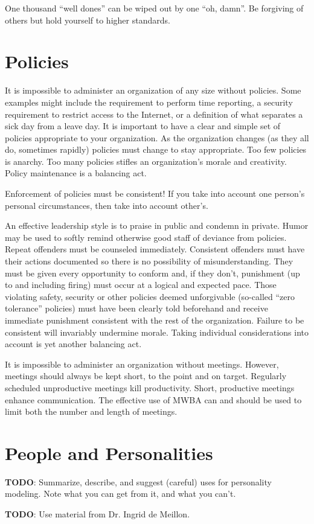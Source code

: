 One thousand ``well dones'' can be wiped out by one ``oh, damn''. Be forgiving of others but hold yourself to higher standards.


\section{Policies}

It is impossible to administer an organization of any size without policies.  Some examples might include the requirement to perform time reporting, a security requirement to restrict access to the Internet, or a definition of what separates a sick day from a leave day. It is important to have a clear and simple set of policies appropriate to your organization.  As the organization changes (as they all do, sometimes rapidly) policies must change to stay appropriate.  Too few policies is anarchy.  Too many policies stifles an organization's morale and creativity. Policy maintenance is a balancing act.

Enforcement of policies must be consistent!  If you take into account one person's personal circumstances, then take into account other's.

An effective leadership style is to praise in public and condemn in private. Humor may be used to softly remind otherwise good staff of deviance from policies.  Repeat offenders must be counseled immediately.  Consistent offenders must have their actions documented so there is no possibility of misunderstanding. They must be given every opportunity to conform and, if they don't, punishment (up to and including firing) must occur at a logical and expected pace.  Those violating safety, security or other policies deemed unforgivable (so-called ``zero tolerance'' policies) must have been clearly told beforehand and receive immediate punishment consistent with the rest of the organization.  Failure to be consistent will invariably undermine morale. Taking individual considerations into account is yet another balancing act.

It is impossible to administer an organization without meetings.  However, meetings should always be kept short, to the point and on target.  Regularly scheduled unproductive meetings kill productivity.  Short, productive meetings enhance communication. The effective use of MWBA can and should be used to limit both the number and length of meetings.


\section{People and Personalities}

\textbf{TODO}: Summarize, describe, and suggest (careful) uses for personality modeling. Note what you can get from it, and what you can't.

\textbf{TODO}: Use material from Dr. Ingrid de Meillon.


\newpage
\thispagestyle{empty}
